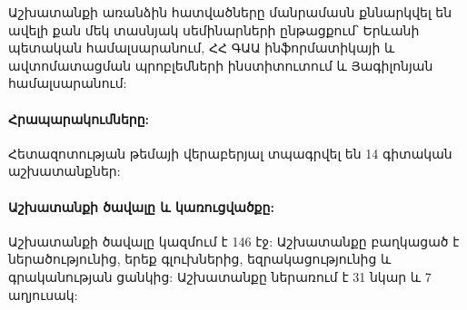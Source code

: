 Աշխատանքի առանձին հատվածները մանրամասն քննարկվել են ավելի քան մեկ տասնյակ սեմինարների ընթացքում՝ Երևանի պետական համալսարանում, ՀՀ ԳԱԱ ինֆորմատիկայի և ավտոմատացման պրոբլեմների ինստիտուտում և Յագիլոնյան համալսարանում:

\paragraph{Հրապարակումները:}
Հետազոտության թեմայի վերաբերյալ տպագրվել են 14 գիտական աշխատանքներ:


\paragraph{Աշխատանքի ծավալը և կառուցվածքը:}
Աշխատանքի ծավալը կազմում է 146 էջ: Աշխատանքը բաղկացած է ներածությունից, երեք գլուխներից, եզրակացությունից և գրականության ցանկից: Աշխատանքը ներառում է 31 նկար և 7 աղյուսակ:


